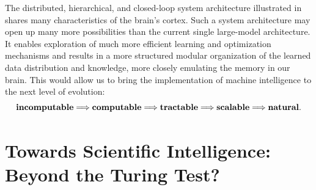 \documentclass[../../book-main.tex]{subfiles}
\begin{document}
The distributed, hierarchical, and closed-loop system architecture
illustrated in  shares many characteristics of the
brain's cortex. Such a system architecture may open up many more
possibilities than the current single large-model architecture. It
enables exploration of much more efficient learning and optimization
mechanisms and results in a more structured modular organization of
the learned data distribution and knowledge, more closely emulating the memory
in our brain. This would allow us to bring the implementation of machine 
intelligence to the next level of evolution:
\begin{equation}
    \text{\textbf{incomputable}}
    \Longrightarrow \text{\textbf{computable}}
    \Longrightarrow \text{\textbf{tractable}} \Longrightarrow
    \text{\textbf{scalable}}
    \Longrightarrow
    \text{\textbf{natural}}.
\end{equation}

\section{Towards Scientific Intelligence: Beyond the Turing Test?}
\end{document}
